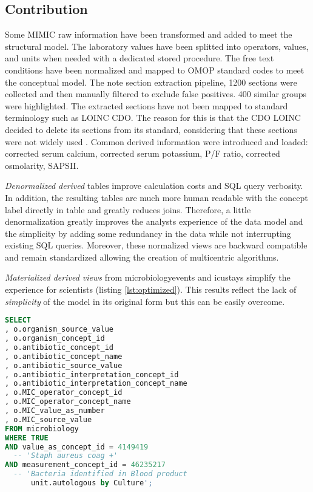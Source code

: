 %
%
\subsection{Contribution}
%
%
Some MIMIC raw information have been transformed and added to meet the
structural model. The laboratory values have been splitted into operators,
values, and units when needed with a dedicated stored procedure. The free text
conditions have been normalized and mapped to OMOP standard codes to meet the
conceptual model.
The note section extraction pipeline, 1200 sections were collected and then
manually filtered to exclude false positives.  400 similar groups were
highlighted. The extracted sections have not been mapped to standard
terminology such as LOINC CDO. The reason for this is that the CDO LOINC
decided to delete its sections from its standard, considering that these
sections were not widely used  \cite{loinc-website}.
Common derived information were introduced and loaded: corrected serum calcium,
corrected serum potassium, P/F ratio, corrected osmolarity, SAPSII.

%
\emph{Denormalized derived} tables improve calculation costs and SQL query
verbosity.  In addition, the resulting tables are much more human readable with
the concept label directly in table and greatly reduces joins. Therefore, a
little denormalization greatly improves the analysts experience of the data
model and the simplicity by adding some redundancy in the data while not
interrupting existing SQL queries. Moreover, these normalized views are
backward compatible and remain standardized allowing the creation of
multicentric algorithms.

\emph{Materialized derived views} from microbiologyevents and icustays simplify
the experience for scientists (listing \ref{lst:optimized}).  This results reflect the lack of
\textit{simplicity} of the model in its original form but this can be easily
overcome.

\begin{lstlisting}[language=sql,basicstyle=\scriptsize,caption=Optimized and denormalized table microbiology SQL query,label={lst:optimized}]
SELECT 
, o.organism_source_value
, o.organism_concept_id
, o.antibiotic_concept_id
, o.antibiotic_concept_name
, o.antibiotic_source_value
, o.antibiotic_interpretation_concept_id
, o.antibiotic_interpretation_concept_name
, o.MIC_operator_concept_id
, o.MIC_operator_concept_name
, o.MIC_value_as_number
, o.MIC_source_value
FROM microbiology
WHERE TRUE
AND value_as_concept_id = 4149419                     			
  -- 'Staph aureus coag +' 
AND measurement_concept_id = 46235217               			
  -- 'Bacteria identified in Blood product 
      unit.autologous by Culture';
\end{lstlisting}

